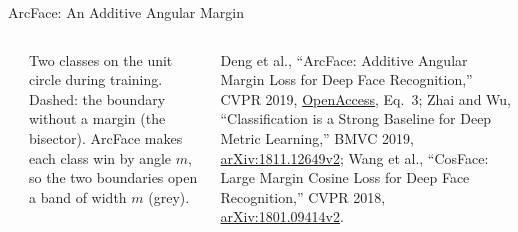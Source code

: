 \begin{frame}{ArcFace: An Additive Angular Margin}
\begin{columns}[T,onlytextwidth]
\\[0.3em]
      {\scriptsize Two classes on the unit circle during training. Dashed: the boundary without a margin (the bisector). ArcFace makes each class win by angle $m$, so the two boundaries open a band of width $m$ (grey).\par}
      \vspace{0.5em}
      {\scriptsize Deng et al., ``ArcFace: Additive Angular Margin Loss for Deep Face Recognition,'' CVPR 2019, \href{https://openaccess.thecvf.com/content_CVPR_2019/papers/Deng_ArcFace_Additive_Angular_Margin_Loss_for_Deep_Face_Recognition_CVPR_2019_paper.pdf}{OpenAccess}, Eq.~3; Zhai and Wu, ``Classification is a Strong Baseline for Deep Metric Learning,'' BMVC 2019, \href{https://arxiv.org/abs/1811.12649v2}{arXiv:1811.12649v2}; Wang et al., ``CosFace: Large Margin Cosine Loss for Deep Face Recognition,'' CVPR 2018, \href{https://arxiv.org/abs/1801.09414v2}{arXiv:1801.09414v2}.\par}
  \end{columns}
\end{frame}

